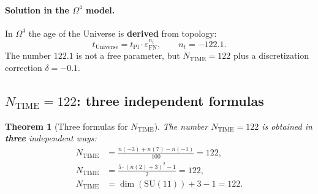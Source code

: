 \documentclass[11pt,a4paper]{article}
\newcommand{\SU}{\mathrm{SU}}
\newcommand{\Om}{\Omega^4}
\newcommand{\epsFN}{\varepsilon_{\text{FN}}}
\newtheorem{theorem}{Theorem}[section]
\theoremstyle{definition}
\begin{document}
\paragraph{Solution in the $\Om$ model.}
In $\Om$ the age of the Universe is \textbf{derived} from topology:
\begin{equation}
    \boxed{
    t_{\text{Universe}} = t_{\text{Pl}} \cdot \epsFN^{n_t},
    \qquad n_t = -122.1.
    }
    \label{eq:time-formula}
\end{equation}
The number $122.1$ is not a free parameter, but $N_{\text{TIME}} = 122$ 
plus a discretization correction $\delta = -0.1$.

\subsection{$N_{\text{TIME}} = 122$: three independent formulas}
\label{subsec:n-time-122}

\begin{theorem}[Three formulas for $N_{\text{TIME}}$]
\label{thm:ntime-three}
The number $N_{\text{TIME}} = 122$ is obtained in \textbf{three} 
independent ways:
\begin{align}
    N_{\text{TIME}} &= \frac{n(-3) + n(7) - n(-1)}{100} = 122,
    \label{eq:ntime-v1} \\[0.3em]
    N_{\text{TIME}} &= \frac{5 \cdot (n(2) + 3)^2 - 1}{2} = 122,
    \label{eq:ntime-v2} \\[0.3em]
    N_{\text{TIME}} &= \dim(\SU(11)) + 3 - 1 = 122.
    \label{eq:ntime-v3}
\end{align}
\end{theorem}
\end{document}
